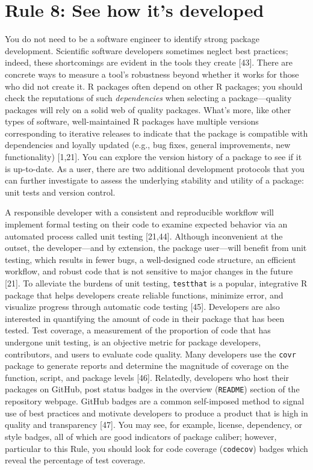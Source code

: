\documentclass[10pt,letterpaper]{article}
\begin{document}
\hypertarget{rule-8-see-how-its-developed}{%
\section{Rule 8: See how it's
developed}\label{rule-8-see-how-its-developed}}

You do not need to be a software engineer to identify strong package
development. Scientific software developers sometimes neglect best
practices; indeed, these shortcomings are evident in the tools they
create {[}43{]}. There are concrete ways to measure a tool's robustness
beyond whether it works for those who did not create it. R packages
often depend on other R packages; you should check the reputations of
such \emph{dependencies} when selecting a package---quality packages
will rely on a solid web of quality packages. What's more, like other
types of software, well-maintained R packages have multiple versions
corresponding to iterative releases to indicate that the package is
compatible with dependencies and loyally updated (e.g., bug fixes,
general improvements, new functionality) {[}1,21{]}. You can explore the
version history of a package to see if it is up-to-date. As a user,
there are two additional development protocols that you can further
investigate to assess the underlying stability and utility of a package:
unit tests and version control.

A responsible developer with a consistent and reproducible workflow will
implement formal testing on their code to examine expected behavior via
an automated process called unit testing {[}21,44{]}. Although
inconvenient at the outset, the developer---and by extension, the
package user---will benefit from unit testing, which results in fewer
bugs, a well-designed code structure, an efficient workflow, and robust
code that is not sensitive to major changes in the future {[}21{]}. To
alleviate the burdens of unit testing, \texttt{testthat} is a popular,
integrative R package that helps developers create reliable functions,
minimize error, and visualize progress through automatic code testing
{[}45{]}. Developers are also interested in quantifying the amount of
code in their package that has been tested. Test coverage, a measurement
of the proportion of code that has undergone unit testing, is an
objective metric for package developers, contributors, and users to
evaluate code quality. Many developers use the \texttt{covr} package to
generate reports and determine the magnitude of coverage on the
function, script, and package levels {[}46{]}. Relatedly, developers who
host their packages on GitHub, post status badges in the overview
(\texttt{README}) section of the repository webpage. GitHub badges are a
common self-imposed method to signal use of best practices and motivate
developers to produce a product that is high in quality and transparency
{[}47{]}. You may see, for example, license, dependency, or style
badges, all of which are good indicators of package caliber; however,
particular to this Rule, you should look for code coverage
(\texttt{codecov}) badges which reveal the percentage of test coverage.
\end{document}
